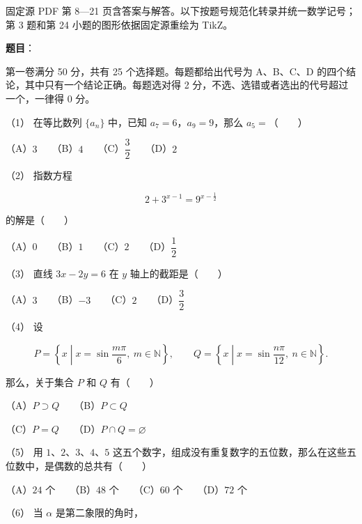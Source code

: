 

\begin{gktip}
固定源 PDF 第 8—21 页含答案与解答。以下按题号规范化转录并统一数学记号；第 3 题和第 24 小题的图形依据固定源重绘为 TikZ。
\end{gktip}

\begin{answer}

\textbf{题目}：

第一卷满分 50 分，共有 25 个选择题。每题都给出代号为 A、B、C、D 的四个结论，其中只有一个结论正确。每题选对得 2 分，不选、选错或者选出的代号超过一个，一律得 0 分。

（1） 在等比数列 $\{a_n\}$ 中，已知 $a_7=6$，$a_9=9$，那么 $a_5=$\mbox{（　　）}

（A）$3$　　（B）$4$　　（C）$\dfrac32$　　（D）$2$

（2） 指数方程

\nopagebreak[4]
\[
2+3^{x-1}=9^{x-\frac12}
\]

的解是\mbox{（　　）}

（A）$0$　　（B）$1$　　（C）$2$　　（D）$\dfrac12$

（3） 直线 $3x-2y=6$ 在 $y$ 轴上的截距是\mbox{（　　）}

（A）$3$　　（B）$-3$　　（C）$2$　　（D）$\dfrac32$

（4） 设

\nopagebreak[4]
\[
P=\left\{x\mathrel{}\middle|\mathrel{}x=\sin\frac{m\pi}{6},\ m\in\mathbb N\right\},\qquad
Q=\left\{x\mathrel{}\middle|\mathrel{}x=\sin\frac{n\pi}{12},\ n\in\mathbb N\right\}.
\]

那么，关于集合 $P$ 和 $Q$ 有\mbox{（　　）}

（A）$P\supset Q$　　（B）$P\subset Q$

（C）$P=Q$　　（D）$P\cap Q=\varnothing$

（5） 用 $1\text{、}2\text{、}3\text{、}4\text{、}5$ 这五个数字，组成没有重复数字的五位数，那么在这些五位数中，是偶数的总共有\mbox{（　　）}

（A）$24$ 个　　（B）$48$ 个　　（C）$60$ 个　　（D）$72$ 个

（6） 当 $\alpha$ 是第二象限的角时，


\end{answer}
